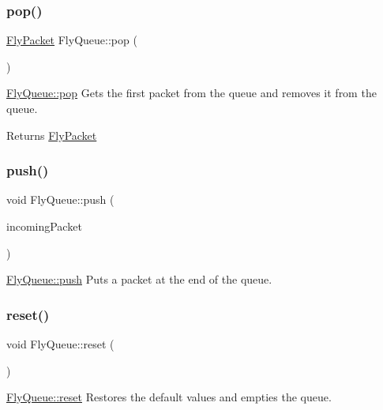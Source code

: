 \subsubsection{\texorpdfstring{pop()}{pop()}}
{\footnotesize\ttfamily \hyperlink{class_fly_packet}{Fly\+Packet} Fly\+Queue\+::pop (\begin{DoxyParamCaption}{ }\end{DoxyParamCaption})}



\hyperlink{class_fly_queue_a96b802276ccd6ce04c42da2765001603}{Fly\+Queue\+::pop} Gets the first packet from the queue and removes it from the queue. 

\begin{DoxyReturn}{Returns}
\hyperlink{class_fly_packet}{Fly\+Packet} 
\end{DoxyReturn}
\hypertarget{class_fly_queue_a93c9830f311b6f97d5e26fd882ef7d04}{}\label{class_fly_queue_a93c9830f311b6f97d5e26fd882ef7d04} 
\subsubsection{\texorpdfstring{push()}{push()}}
{\footnotesize\ttfamily void Fly\+Queue\+::push (\begin{DoxyParamCaption}\item[{\hyperlink{class_fly_packet}{Fly\+Packet}}]{incoming\+Packet }\end{DoxyParamCaption})}



\hyperlink{class_fly_queue_a93c9830f311b6f97d5e26fd882ef7d04}{Fly\+Queue\+::push} Puts a packet at the end of the queue. 

\hypertarget{class_fly_queue_ac3f3e14584bf80481cb9fc9e0c14019a}{}\label{class_fly_queue_ac3f3e14584bf80481cb9fc9e0c14019a} 
\subsubsection{\texorpdfstring{reset()}{reset()}}
{\footnotesize\ttfamily void Fly\+Queue\+::reset (\begin{DoxyParamCaption}{ }\end{DoxyParamCaption})}



\hyperlink{class_fly_queue_ac3f3e14584bf80481cb9fc9e0c14019a}{Fly\+Queue\+::reset} Restores the default values and empties the queue. 

